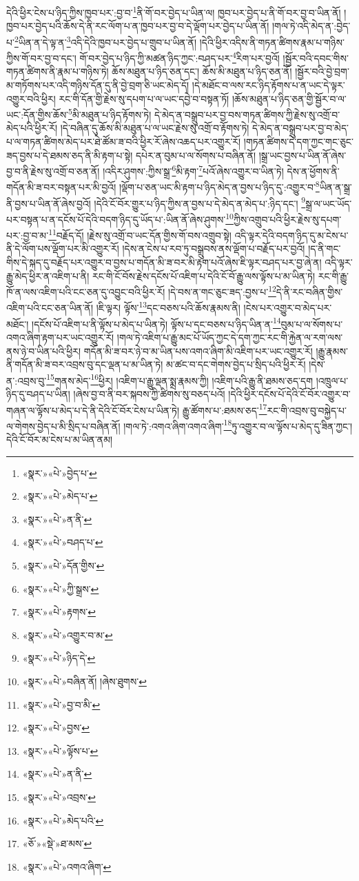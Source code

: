 དེའི་ཕྱིར་ངེས་པ་ཉིད་ཀྱིས་ཁྱབ་པར་:བྱ་བ་\footnote{«སྣར་»«པེ་»བྱེད་པ་}ནི་གོ་བར་བྱེད་པ་ཡིན་ལ། ཁྱབ་པར་བྱེད་པ་ནི་གོ་བར་བྱ་བ་ཡིན་ནོ། །ཁྱབ་པར་བྱེད་པའི་ཆོས་དེ་ནི་རང་ལོག་པ་ན་ཁྱབ་པར་བྱ་བ་དེ་ལྡོག་པར་བྱེད་པ་ཡིན་ནོ། །གལ་ཏེ་འདི་མེད་ན་:བྱེད་པ་\footnote{«སྣར་»«པེ་»མེད་པ་}ཡིན་ན་དེ་ལྟ་ན་\footnote{«སྣར་»«པེ་»ན་ནི་}འདི་དེའི་ཁྱབ་པར་བྱེད་པ་གྲུབ་པ་ཡིན་ནོ། །དེའི་ཕྱིར་འདིས་ནི་གཏན་ཚིགས་རྣམ་པ་གཉིས་ཀྱིས་གོ་བར་བྱ་བ་དང་། གོ་བར་བྱེད་པ་ཉིད་ཀྱི་མཚན་ཉིད་ཀྱང་:བཤད་པར་\footnote{«སྣར་»«པེ་»བཤད་པ་}རིག་པར་བྱའོ། །སྦྱོར་བའི་དབང་གིས་གཏན་ཚིགས་ནི་རྣམ་པ་གཉིས་ཏེ། ཆོས་མཐུན་པ་ཉིད་ཅན་དང་། ཆོས་མི་མཐུན་པ་ཉིད་ཅན་ནོ། །སྦྱོར་བའི་བྱེ་བྲག་མ་གཏོགས་པར་འདི་གཉིས་དོན་དུ་ནི་བྱེ་བྲག་ཅི་ཡང་མེད་དོ། །དེ་མཐོང་བ་ལས་རང་ཉིད་རྟོགས་པ་ན་ཡང་དེ་ལྟར་འགྱུར་བའི་ཕྱིར། རང་གི་དོན་གྱི་རྗེས་སུ་དཔག་པ་ལ་ཡང་དབྱེ་བ་བསྟན་ཏོ། །ཆོས་མཐུན་པ་ཉིད་ཅན་གྱི་སྦྱོར་བ་ལ་ཡང་:དོན་གྱིས་ཆོས་\footnote{«སྣར་»«པེ་»དོན་གྱིས་}མི་མཐུན་པ་ཉིད་རྟོགས་ཏེ། དེ་མེད་ན་བསྒྲུབ་པར་བྱ་བས་གཏན་ཚིགས་ཀྱི་རྗེས་སུ་འགྲོ་བ་མེད་པའི་ཕྱིར་རོ། །དེ་བཞིན་དུ་ཆོས་མི་མཐུན་པ་ལ་ཡང་རྗེས་སུ་འགྲོ་བ་རྟོགས་ཏེ། དེ་མེད་ན་བསྒྲུབ་པར་བྱ་བ་མེད་པ་ལ་གཏན་ཚིགས་མེད་པར་ཐེ་ཚོམ་ཟ་བའི་ཕྱིར་རོ་ཞེས་འཆད་པར་འགྱུར་རོ། །གཏན་ཚིགས་དེ་དག་ཀྱང་གང་ཅུང་ཟད་བྱས་པ་དེ་ཐམས་ཅད་ནི་མི་རྟག་པ་སྟེ། དཔེར་ན་བུམ་པ་ལ་སོགས་པ་བཞིན་ནོ། །སྒྲ་ཡང་བྱས་པ་ཡིན་ནོ་ཞེས་བྱ་བ་ནི་རྗེས་སུ་འགྲོ་བ་ཅན་ནོ། །འདིར་ཤུགས་:ཀྱིས་སྒྲ་\footnote{«སྣར་»«པེ་»ཀྱི་སྒྲས་}མི་རྟག་\footnote{«སྣར་»«པེ་»རྟགས་}པའོ་ཞེས་འགྱུར་བ་ཡིན་ཏེ། དེས་ན་ཕྱོགས་ནི་གདོན་མི་ཟ་བར་བསྟན་པར་མི་བྱའོ། །ལྡོག་པ་ཅན་ཡང་མི་རྟག་པ་ཉིད་མེད་ན་བྱས་པ་ཉིད་དུ་:འགྱུར་བ་\footnote{«སྣར་»«པེ་»འགྱུར་བ་མ་}ཡིན་ན་སྒྲ་ནི་བྱས་པ་ཡིན་ནོ་ཞེས་བྱའོ། །དེའི་ངོ་བོར་གྱུར་པ་ཉིད་ཀྱིས་ན་བྱས་པ་དེ་མེད་ན་མེད་པ་:ཉིད་དང་། \footnote{«སྣར་»«པེ་»ཉིད་དེ་}སྒྲ་ལ་ཡང་ཡོད་པར་བསྟན་པ་ན་དངོས་པོ་དེའི་བདག་ཉིད་དུ་ཡོད་པ་:ཡིན་ནོ་ཞེས་ཤུགས་\footnote{«སྣར་»«པེ་»བཞིན་ནོ། །ཞེས་ཐུགས་}ཀྱིས་འགྲུབ་པའི་ཕྱིར་རྗེས་སུ་དཔག་པར་:བྱ་བ་མ་\footnote{«སྣར་»«པེ་»བྱ་བ་མི་}བརྗོད་དོ། །རྗེས་སུ་འགྲོ་བ་ཡང་དོན་གྱིས་གོ་བས་འགྲུབ་སྟེ། འདི་ལྟར་དེའི་བདག་ཉིད་དུ་མ་ངེས་པ་ནི་དེ་ལོག་པས་ལྡོག་པར་མི་འགྱུར་རོ། །དེས་ན་ངེས་པ་རབ་ཏུ་བསྒྲུབས་ནས་ལྡོག་པ་བརྗོད་པར་བྱའོ། །ད་ནི་གང་གིས་དེ་སྐད་དུ་བརྗོད་པར་འགྱུར་བ་བྱས་པ་གདོན་མི་ཟ་བར་མི་རྟག་པའོ་ཞེས་ཇི་ལྟར་བཤད་པར་བྱ་ཞེ་ན། འདི་ལྟར་རྒྱུ་མེད་ཕྱིར་ན་འཇིག་པ་ནི། རང་གི་ངོ་བོས་རྗེས་དངོས་པོ་འཇིག་པ་དེའི་ངོ་བོ་རྒྱུ་ལས་ལྟོས་པ་མ་ཡིན་ཏེ། རང་གི་རྒྱུ་ཁོ་ན་ལས་འཇིག་པའི་ངང་ཅན་དུ་འབྱུང་བའི་ཕྱིར་རོ། །དེ་བས་ན་གང་ཅུང་ཟད་:བྱས་པ་\footnote{«སྣར་»«པེ་»བྱས་}དེ་ནི་རང་བཞིན་གྱིས་འཇིག་པའི་ངང་ཅན་ཡིན་ནོ། །ཇི་ལྟར། ལྟོས་\footnote{«སྣར་»«པེ་»ལྟོས་པ་}དང་བཅས་པའི་ཆོས་རྣམས་ནི། །ངེས་པར་འགྱུར་བ་མེད་པར་མཐོང་། །དངོས་པོ་འཇིག་པ་ནི་ལྟོས་པ་མེད་པ་ཡིན་ཏེ། ལྟོས་པ་དང་བཅས་པ་ཉིད་ཡིན་ན་\footnote{«སྣར་»«པེ་»ན་ནི་}བུམ་པ་ལ་སོགས་པ་འགའ་ཞིག་རྟག་པར་ཡང་འགྱུར་རོ། །གལ་ཏེ་འཇིག་པ་རྒྱུ་མང་པོ་ཡོད་ཀྱང་དེ་དག་ཀྱང་རང་གི་རྐྱེན་ལ་རག་ལས་ནས་ཉེ་བ་ཡིན་པའི་ཕྱིར། གདོན་མི་ཟ་བར་ཉེ་བ་མ་ཡིན་པས་འགའ་ཞིག་མི་འཇིག་པར་ཡང་འགྱུར་རོ། །རྒྱུ་རྣམས་ནི་གདོན་མི་ཟ་བར་འབྲས་བུ་དང་ལྡན་པ་མ་ཡིན་ཏེ། མ་ཚང་བ་དང་གེགས་བྱེད་པ་སྲིད་པའི་ཕྱིར་རོ། །དེས་ན་:འབྲས་བུ་\footnote{«སྣར་»«པེ་»འབྲས་}གནས་མེད་\footnote{«སྣར་»«པེ་»མེད་པའི་}ཕྱིར། །འཇིག་པ་རྒྱུ་ལྡན་སྨྲ་རྣམས་ཀྱི། །འཇིག་པའི་རྒྱུ་ནི་ཐམས་ཅད་དག །འཁྲུལ་པ་ཉིད་དུ་བཤད་པ་ཡིན། །ཞེས་བྱ་བ་ནི་བར་སྐབས་ཀྱི་ཚིགས་སུ་བཅད་པའོ། །དེའི་ཕྱིར་དངོས་པོ་དེའི་ངོ་བོར་འགྱུར་བ་གཞན་ལ་ལྟོས་པ་མེད་པ་དེ་ནི་དེའི་ངོ་བོར་ངེས་པ་ཡིན་ཏེ། རྒྱུ་ཚོགས་པ་:ཐམས་ཅད་\footnote{«ཅོ་»«སྡེ་»ཐ་མས་}རང་གི་འབྲས་བུ་བསྐྱེད་པ་ལ་གེགས་བྱེད་པ་མི་སྲིད་པ་བཞིན་ནོ། །གལ་ཏེ་:འགའ་ཞིག་འགའ་ཞིག་\footnote{«སྣར་»«པེ་»འགའ་ཞིག་}ཏུ་འགྱུར་བ་ལ་ལྟོས་པ་མེད་དུ་ཟིན་ཀྱང་། དེའི་ངོ་བོར་མ་ངེས་པ་མ་ཡིན་ནམ། 